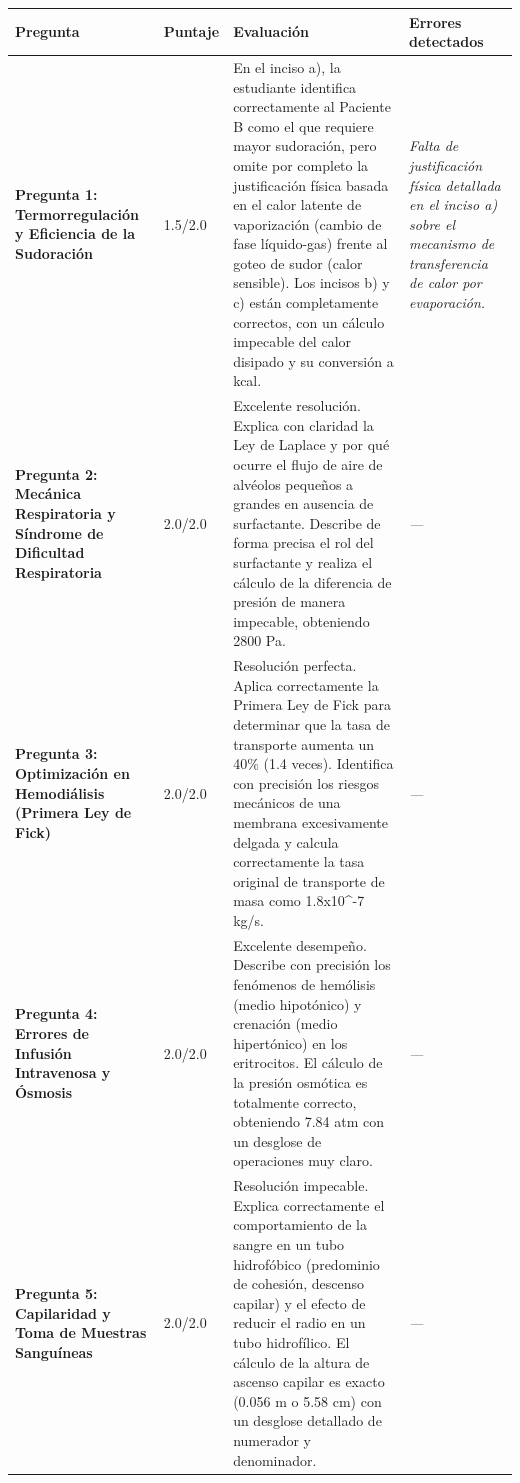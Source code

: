 \documentclass[11pt,a4paper]{article}
\begin{document}
\begin{longtable}{>{\bfseries}p{2.8cm} p{1.6cm} p{7.0cm} p{2.8cm}}
  \toprule
  \textbf{Pregunta} & \textbf{Puntaje} & \textbf{Evaluación} & \textbf{Errores detectados} \\
  \midrule
  \endhead
  \bottomrule
  \endfoot
    \textbf{Pregunta 1: Termorregulación y Eficiencia de la Sudoración} & 1.5/2.0 & En el inciso a), la estudiante identifica correctamente al Paciente B como el que requiere mayor sudoración, pero omite por completo la justificación física basada en el calor latente de vaporización (cambio de fase líquido-gas) frente al goteo de sudor (calor sensible). Los incisos b) y c) están completamente correctos, con un cálculo impecable del calor disipado y su conversión a kcal. & \textit{Falta de justificación física detallada en el inciso a) sobre el mecanismo de transferencia de calor por evaporación.} \\
    \midrule
    \textbf{Pregunta 2: Mecánica Respiratoria y Síndrome de Dificultad Respiratoria} & 2.0/2.0 & Excelente resolución. Explica con claridad la Ley de Laplace y por qué ocurre el flujo de aire de alvéolos pequeños a grandes en ausencia de surfactante. Describe de forma precisa el rol del surfactante y realiza el cálculo de la diferencia de presión de manera impecable, obteniendo 2800 Pa. & \textit{---} \\
    \midrule
    \textbf{Pregunta 3: Optimización en Hemodiálisis (Primera Ley de Fick)} & 2.0/2.0 & Resolución perfecta. Aplica correctamente la Primera Ley de Fick para determinar que la tasa de transporte aumenta un 40\% (1.4 veces). Identifica con precisión los riesgos mecánicos de una membrana excesivamente delgada y calcula correctamente la tasa original de transporte de masa como 1.8x10\textasciicircum{}-7 kg/s. & \textit{---} \\
    \midrule
    \textbf{Pregunta 4: Errores de Infusión Intravenosa y Ósmosis} & 2.0/2.0 & Excelente desempeño. Describe con precisión los fenómenos de hemólisis (medio hipotónico) y crenación (medio hipertónico) en los eritrocitos. El cálculo de la presión osmótica es totalmente correcto, obteniendo 7.84 atm con un desglose de operaciones muy claro. & \textit{---} \\
    \midrule
    \textbf{Pregunta 5: Capilaridad y Toma de Muestras Sanguíneas} & 2.0/2.0 & Resolución impecable. Explica correctamente el comportamiento de la sangre en un tubo hidrofóbico (predominio de cohesión, descenso capilar) y el efecto de reducir el radio en un tubo hidrofílico. El cálculo de la altura de ascenso capilar es exacto (0.056 m o 5.58 cm) con un desglose detallado de numerador y denominador. & \textit{---} \\
    \midrule
\end{longtable}
\end{document}
